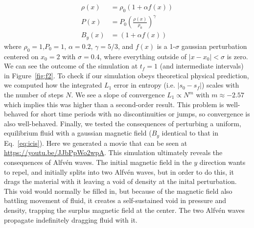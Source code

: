 \documentclass[iop,twocolumn]{emulateapj}
\begin{document}
\begin{align}\label{eq:icis}
  \rho(x)&=\rho_0(1+\alpha f(x))\nonumber\\
  P(x)&=P_0\left(\frac{\rho(x)}{\rho_0}\right)^\gamma\nonumber\\
  B_y(x)&=(1+\alpha f(x))
\end{align}
where $\rho_0=1$,$P_0=1$, $\alpha=0.2$, $\gamma=5/3$, and $f(x)$ is a 1-$\sigma$ gaussian perturbation centered on $x_0=2$ with $\sigma=0.4$, where everything outside of $|x-x_0|<\sigma$ is zero. We can see the outcome of the simulation at $t_f=1$ (and intermediate intervals) in Figure~\ref{fig:f2}. To check if our simulation obeys theoretical physical prediction, we computed how the integrated $L_1$ error in entropy (i.e. $|s_0-s_f|$) scales with the number of steps $N$. We see a slope of convergence $L_1\propto N^m$ with $m\approx-2.57$ which implies this was higher than a second-order result. This problem is well-behaved for short time periods with no discontinuities or jumps, so convergence is also well-behaved. Finally, we tested the consequences of perturbing a uniform, equilibrium fluid with a gaussian magnetic field ($B_y$ identical to that in Eq.~\ref{eq:icis}). Here we generated a movie that can be seen at \url{https://youtu.be/JJbPpWo2wpA}. This simulation ultimately reveals the consequences of Alfv{\'e}n waves. The initial magnetic field in the $y$ direction wants to repel, and initially splits into two Alfv{\'e}n waves, but in order to do this, it drags the material with it leaving a void of density at the inital perturbation. This void would normally be filled in, but because of the magnetic field also battling movement of fluid, it creates a self-sustained void in pressure and density, trapping the surplus magnetic field at the center. The two Alfv{\'e}n waves propagate indefinitely dragging fluid with it.
\end{document}
